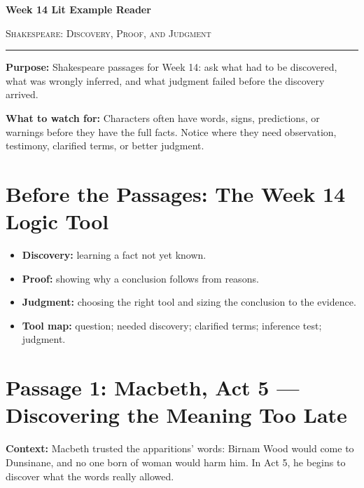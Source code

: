 \documentclass[12pt]{article}
\begin{document}
\begin{center}
{\LARGE\bfseries Week 14 Lit Example Reader}\par\vspace{0.02em}
{\large\scshape Shakespeare: Discovery, Proof, and Judgment}\par\vspace{0.06em}
\rule{0.78\textwidth}{0.5pt}
\end{center}

\textbf{Purpose:} Shakespeare passages for Week 14: ask what had to be discovered, what was wrongly inferred, and what judgment failed before the discovery arrived.

\textbf{What to watch for:} Characters often have words, signs, predictions, or warnings before they have the full facts. Notice where they need observation, testimony, clarified terms, or better judgment.

\section*{Before the Passages: The Week 14 Logic Tool}

\begin{itemize}[leftmargin=1.3em,itemsep=0.05em,topsep=0.08em,parsep=0.03em]
\item \textbf{Discovery:} learning a fact not yet known.
\item \textbf{Proof:} showing why a conclusion follows from reasons.
\item \textbf{Judgment:} choosing the right tool and sizing the conclusion to the evidence.
\item \textbf{Tool map:} question; needed discovery; clarified terms; inference test; judgment.
\end{itemize}

\section*{Passage 1: Macbeth, Act 5 --- Discovering the Meaning Too Late}

\textbf{Context:} Macbeth trusted the apparitions' words: Birnam Wood would come to Dunsinane, and no one born of woman would harm him. In Act 5, he begins to discover what the words really allowed.
\end{document}
